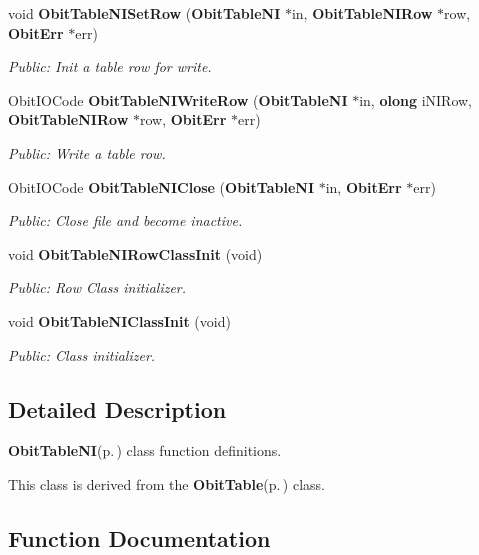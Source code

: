 \begin{CompactItemize}
void {\bf Obit\-Table\-NISet\-Row} ({\bf Obit\-Table\-NI} $\ast$in, {\bf Obit\-Table\-NIRow} $\ast$row, {\bf Obit\-Err} $\ast$err)
\begin{CompactList}\small\item\em Public: Init a table row for write. \item\end{CompactList}\item 
Obit\-IOCode {\bf Obit\-Table\-NIWrite\-Row} ({\bf Obit\-Table\-NI} $\ast$in, {\bf olong} i\-NIRow, {\bf Obit\-Table\-NIRow} $\ast$row, {\bf Obit\-Err} $\ast$err)
\begin{CompactList}\small\item\em Public: Write a table row. \item\end{CompactList}\item 
Obit\-IOCode {\bf Obit\-Table\-NIClose} ({\bf Obit\-Table\-NI} $\ast$in, {\bf Obit\-Err} $\ast$err)
\begin{CompactList}\small\item\em Public: Close file and become inactive. \item\end{CompactList}\item 
void {\bf Obit\-Table\-NIRow\-Class\-Init} (void)
\begin{CompactList}\small\item\em Public: Row Class initializer. \item\end{CompactList}\item 
void {\bf Obit\-Table\-NIClass\-Init} (void)
\begin{CompactList}\small\item\em Public: Class initializer. \item\end{CompactList}\end{CompactItemize}


\subsection{Detailed Description}
{\bf Obit\-Table\-NI}{\rm (p.\,\pageref{structObitTableNI})} class function definitions. 

This class is derived from the {\bf Obit\-Table}{\rm (p.\,\pageref{structObitTable})} class.

\subsection{Function Documentation}
